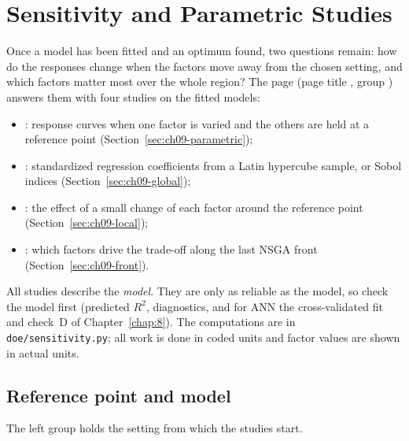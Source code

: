 \chapter{Sensitivity and Parametric Studies}\label{chap:9}
\label{ch:09}

Once a model has been fitted and an optimum found, two questions remain: how do the responses change when the
factors move away from the chosen setting, and which factors matter most over the whole region? The page
 (page title , group ) answers them with four
studies on the fitted models:
\begin{itemize}
  \item {}: response curves when one factor is varied and the others are held at a reference
        point (Section~\ref{sec:ch09-parametric});
  \item {}: standardized regression coefficients from a Latin hypercube sample, or Sobol
        indices (Section~\ref{sec:ch09-global});
  \item {}: the effect of a small change of each factor around the reference point
        (Section~\ref{sec:ch09-local});
  \item {}: which factors drive the trade-off along the last NSGA front
        (Section~\ref{sec:ch09-front}).
\end{itemize}
All studies describe the \emph{model}. They are only as reliable as the model, so check the model first (predicted
$R^2$, diagnostics, and for ANN the cross-validated fit and check~D of Chapter~\ref{chap:8}). The computations are in
\texttt{doe/sensitivity.py}; all work is done in coded units and factor values are shown in actual units.

\section{Reference point and model}
\label{sec:ch09-reference}
The left group  holds the setting from which the studies start.

